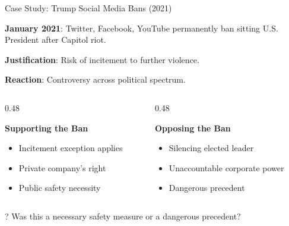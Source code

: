 ﻿\documentclass[aspectratio=169]{beamer}
\begin{document}
\begin{frame}{Case Study: Trump Social Media Bans (2021)}
\begin{casestudybox}
\textbf{January 2021}: Twitter, Facebook, YouTube permanently ban sitting U.S. President after Capitol riot.

\textbf{Justification}: Risk of incitement to further violence.

\textbf{Reaction}: Controversy across political spectrum.
\end{casestudybox}

\vspace{0.2cm}
\begin{columns}[T]
\begin{column}{0.48\textwidth}
\begin{block}{\textbf{Supporting the Ban}}
\begin{itemize}
    \item Incitement exception applies
    \item Private company's right
    \item Public safety necessity
\end{itemize}
\end{block}
\end{column}

\begin{column}{0.48\textwidth}
\begin{block}{\textbf{Opposing the Ban}}
\begin{itemize}
    \item Silencing elected leader
    \item Unaccountable corporate power
    \item Dangerous precedent
\end{itemize}
\end{block}
\end{column}
\end{columns}

\begin{alertblock}{?}
Was this a necessary safety measure or a dangerous precedent?
\end{alertblock}
\end{frame}
\end{document}
